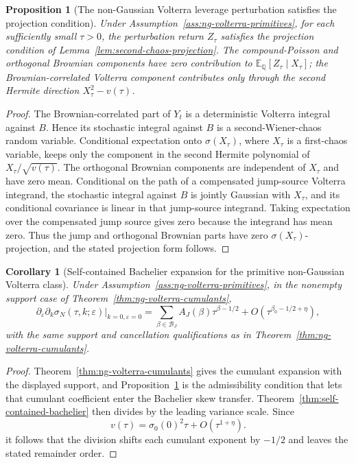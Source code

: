 \documentclass[11pt,a4paper]{amsart}
\theoremstyle{plain}
\newtheorem{proposition}[theorem]{Proposition}
\newtheorem{corollary}[theorem]{Corollary}
\theoremstyle{definition}
\theoremstyle{remark}
\newcommand{\QQ}{\mathbb{Q}}
\newcommand{\EE}{\mathbb{E}}
\begin{document}
\begin{proposition}[The non-Gaussian Volterra leverage perturbation satisfies the projection condition]\label{prop:ng-volterra-projection-condition}
Under Assumption~\ref{ass:ng-volterra-primitives}, for each sufficiently small \(\tau>0\), the
perturbation return \(Z_\tau\) satisfies the projection condition of
Lemma~\ref{lem:second-chaos-projection}.  The compound-Poisson and orthogonal Brownian components
have zero contribution to \(\EE_\QQ[Z_\tau\mid X_\tau]\); the Brownian-correlated Volterra
component contributes only through the second Hermite direction \(X_\tau^2-v(\tau)\).
\end{proposition}

\begin{proof}
The Brownian-correlated part of \(Y_t\) is a deterministic Volterra integral against \(B\).  Hence
its stochastic integral against \(B\) is a second-Wiener-chaos random variable.  Conditional
expectation onto \(\sigma(X_\tau)\), where \(X_\tau\) is a first-chaos variable, keeps only the
component in the second Hermite polynomial of \(X_\tau/\sqrt{v(\tau)}\).  The orthogonal Brownian
components are independent of \(X_\tau\) and have zero mean.  Conditional on the path of a
compensated jump-source Volterra integrand, the stochastic integral against \(B\) is jointly
Gaussian with \(X_\tau\), and its conditional covariance is linear in that jump-source integrand.
Taking expectation over the compensated jump source gives zero because the integrand has mean
zero.  Thus the jump and orthogonal Brownian parts have zero \(\sigma(X_\tau)\)-projection, and
the stated projection form follows.
\end{proof}

\begin{corollary}[Self-contained Bachelier expansion for the primitive non-Gaussian Volterra class]\label{cor:self-contained-bachelier-ng-volterra}
Under Assumption~\ref{ass:ng-volterra-primitives}, in the nonempty support case of
Theorem~\ref{thm:ng-volterra-cumulants},
\[
        \partial_\varepsilon\partial_k\sigma_N(\tau,k;\varepsilon)
        \big|_{k=0,\varepsilon=0}
        =
        \sum_{\beta\in\mathcal B_J}A_J(\beta)\tau^{\beta-1/2}
        +
        O(\tau^{\beta_0-1/2+\eta}),
\]
with the same support and cancellation qualifications as in
Theorem~\ref{thm:ng-volterra-cumulants}.
\end{corollary}

\begin{proof}
Theorem~\ref{thm:ng-volterra-cumulants} gives the cumulant expansion with the displayed support,
and Proposition~\ref{prop:ng-volterra-projection-condition} is the admissibility condition that
lets that cumulant coefficient enter the Bachelier skew transfer.  Theorem~\ref{thm:self-contained-bachelier}
then divides by the leading variance scale.  Since
\[
        v(\tau)=\sigma_0(0)^2\tau+O(\tau^{1+\eta}).
\]
it follows that the division shifts each cumulant exponent by \(-1/2\) and leaves the stated
remainder order.
\end{proof}
\end{document}
